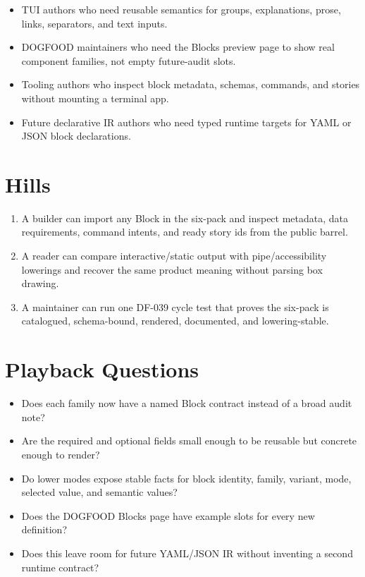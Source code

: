 \begin{itemize}
\tightlist
\item
  TUI authors who need reusable semantics for groups, explanations, prose, links, separators, and text inputs.
\item
  DOGFOOD maintainers who need the Blocks preview page to show real component families, not empty future-audit slots.
\item
  Tooling authors who inspect block metadata, schemas, commands, and stories without mounting a terminal app.
\item
  Future declarative IR authors who need typed runtime targets for YAML or JSON block declarations.
\end{itemize}

\section{Hills}\label{record-094-hills}

\begin{enumerate}
\def\labelenumi{\arabic{enumi}.}
\tightlist
\item
  A builder can import any Block in the six-pack and inspect metadata, data requirements, command intents, and ready story ids from the public barrel.
\item
  A reader can compare interactive/static output with pipe/accessibility lowerings and recover the same product meaning without parsing box drawing.
\item
  A maintainer can run one DF-039 cycle test that proves the six-pack is catalogued, schema-bound, rendered, documented, and lowering-stable.
\end{enumerate}

\section{Playback Questions}\label{record-094-playback-questions}

\begin{itemize}
\tightlist
\item
  Does each family now have a named Block contract instead of a broad audit note?
\item
  Are the required and optional fields small enough to be reusable but concrete enough to render?
\item
  Do lower modes expose stable facts for block identity, family, variant, mode, selected value, and semantic values?
\item
  Does the DOGFOOD Blocks page have example slots for every new definition?
\item
  Does this leave room for future YAML/JSON IR without inventing a second runtime contract?
\end{itemize}

